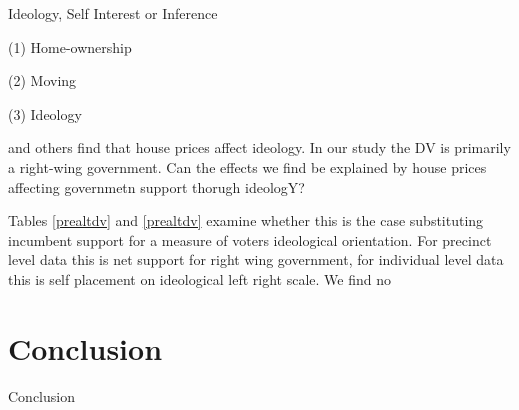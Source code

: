 \documentclass[12pt,a4paper]{article}
\begin{document}
Ideology, Self Interest or Inference

(1) Home-ownership

(2) Moving

(3) Ideology



\citet{ansell2014political} and others find that house prices affect ideology. In our study the DV is primarily a right-wing government. Can the effects we find be explained by house prices affecting governmetn support thorugh ideologY?

Tables \ref{prealtdv} and \ref{prealtdv} examine whether this is the case substituting incumbent support for a measure of voters ideological orientation. For precinct level data this is net support for right wing government, for individual level data this is self placement on ideological left right scale. We find no 






\section{Conclusion}
Conclusion

\end{document}
